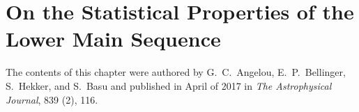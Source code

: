 









%


\chapter{On the Statistical Properties of the Lower Main Sequence}
\label{chap:statistical}

The contents of this chapter were authored 
by G.~C.~Angelou, E.~P.~Bellinger, S.~Hekker, and S.~Basu and published in April of 2017 in \emph{The Astrophysical Journal}, 839 (2), 116.
\nocite{2017apj...839..116a}


